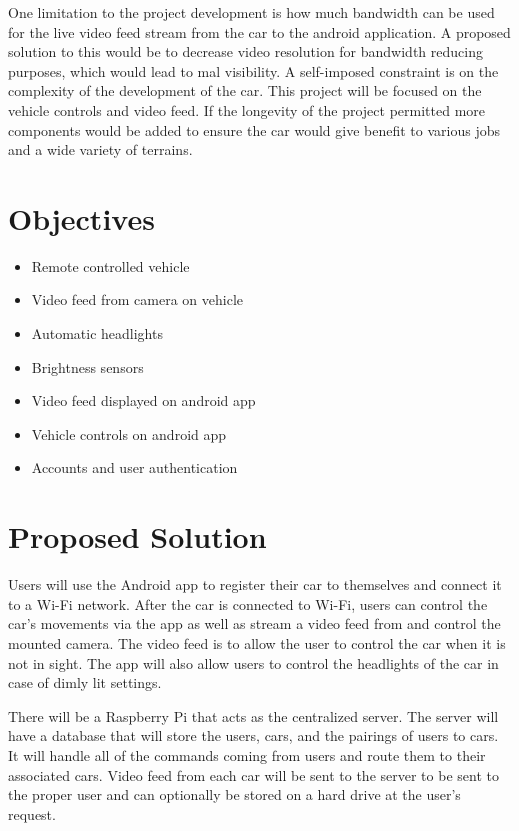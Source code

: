 \documentclass[letterpaper,12pt]{report}
\begin{document}
	One limitation to the project development is how much bandwidth can be used
	for the live video feed stream from the car to the android application. A
	proposed solution to this would be to decrease video resolution for
	bandwidth reducing purposes, which would lead to mal visibility. A
	self-imposed constraint is on the complexity of the development of the car.
	This project will be focused on the vehicle controls and video feed. If the
	longevity of the project permitted more components would be added to ensure
	the car would give benefit to various jobs and a wide variety of terrains.

	\section*{Objectives}
	\markright{}
	\begin{itemize}
		\item Remote controlled vehicle
		\item Video feed from camera on vehicle
		\item Automatic headlights
		\item Brightness sensors
		\item Video feed displayed on android app
		\item Vehicle controls on android app
		\item Accounts and user authentication
	\end{itemize}

	\section*{Proposed Solution}
	\markright{}
	Users will use the Android app to register their car to themselves and
	connect it to a Wi-Fi network. After the car is connected to Wi-Fi, users
	can control the car’s movements via the app as well as stream a video feed
	from and control the mounted camera. The video feed is to allow the user to
	control the car when it is not in sight. The app will also allow users to
	control the headlights of the car in case of dimly lit settings.

	There will be a Raspberry Pi that acts as the centralized server. The
	server will have a database that will store the users, cars, and the
	pairings of users to cars. It will handle all of the commands coming from
	users and route them to their associated cars. Video feed from each car
	will be sent to the server to be sent to the proper user and can optionally
	be stored on a hard drive at the user’s request.
\end{document}
